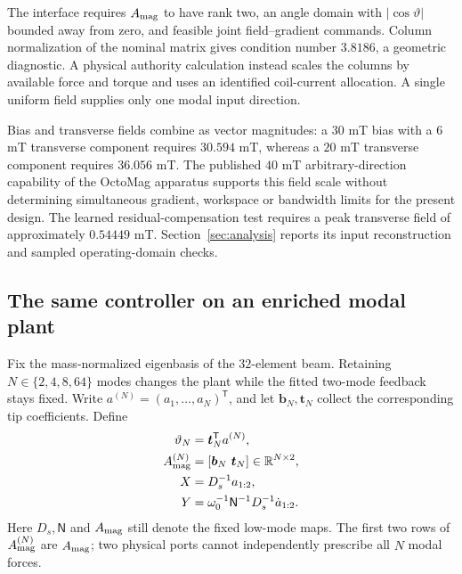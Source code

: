 The interface requires $A_{\rm mag}$ to have rank two, an angle domain
with $|\cos\vartheta|$ bounded away from zero, and feasible joint
field--gradient commands. Column normalization of the nominal matrix
gives condition number $3.8186$, a geometric diagnostic. A physical
authority calculation instead scales the columns by available force
and torque and uses an identified coil-current allocation. A single
uniform field supplies only one modal input direction.

Bias and transverse fields combine as vector magnitudes: a $30$ mT
bias with a $6$ mT transverse component requires $30.594$ mT, whereas
a $20$ mT transverse component requires $36.056$ mT. The published
$40$ mT arbitrary-direction capability of the OctoMag apparatus
\citep{lussi2021cvs} supports this field scale without determining
simultaneous gradient, workspace or bandwidth limits for the present
design. The learned residual-compensation test requires a peak
transverse field of approximately $0.54449$ mT. Section~\ref{sec:analysis}
reports its input reconstruction and sampled operating-domain checks.

\subsection{The same controller on an enriched modal plant}
\label{app:full-model}
Fix the mass-normalized eigenbasis of the $32$-element beam. Retaining
$N\in\{2,4,8,64\}$ modes changes the plant while the fitted two-mode
feedback stays fixed. Write
$a^{(N)}=(a_1,\ldots,a_N)^{\mathsf T}$, and let
$\boldsymbol b_N,\boldsymbol t_N$ collect the corresponding tip
coefficients. Define
\begin{align}
 \vartheta_N&=\boldsymbol t_N^{\mathsf T}a^{(N)},\nonumber\\
 A_{\rm mag}^{(N)}&=[\boldsymbol b_N\ \boldsymbol t_N]
                         \in\mathbb R^{N\times2},\nonumber\\
 X&=D_s^{-1}a_{1:2},\nonumber\\
 Y&=\omega_0^{-1}\mathsf N^{-1}D_s^{-1}\dot a_{1:2}.
 \label{app:enriched-coordinates}
\end{align}
Here $D_s,\mathsf N$ and $A_{\rm mag}$ still denote the fixed low-mode
maps. The first two rows of $A_{\rm mag}^{(N)}$ are $A_{\rm mag}$;
two physical ports cannot independently prescribe all $N$ modal
forces.

